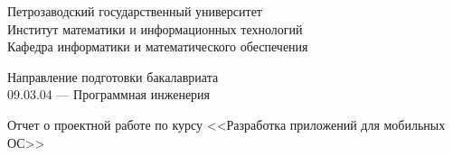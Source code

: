 \documentclass[a4paper,12pt]{article}
\renewcommand{\baselinestretch}{1.50}
\begin{document}

\thispagestyle{empty}
\begin{center}


    \renewcommand{\baselinestretch}{1}
    {\large
        {\sc Петрозаводский государственный университет\\
            Институт математики и информационных технологий\\
            Кафедра информатики и математического обеспечения
        }
    }

\end{center}


\begin{center}
    Направление подготовки бакалавриата \\
    09.03.04 --- Программная инженерия \\
\end{center}

\vfill

\begin{center}

    {\normalsize
        Отчет о проектной работе по курсу <<Разработка приложений для мобильных ОС>>}
    \medskip

    {\Large {}} \\
\end{center}

\medskip
\end{document}
